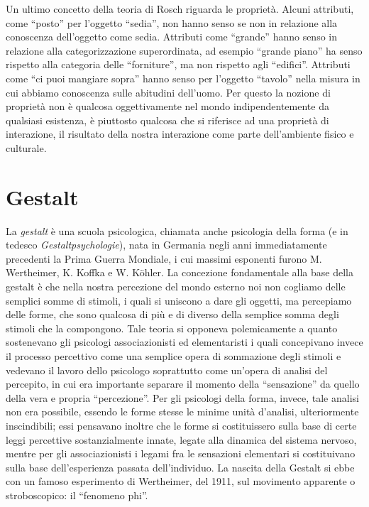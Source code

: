 Un ultimo concetto della teoria di Rosch riguarda le proprietà. Alcuni attributi, come ``posto'' per l’oggetto ``sedia'', non hanno senso se non in relazione alla conoscenza dell’oggetto come sedia. Attributi come ``grande'' hanno senso in relazione alla categorizzazione superordinata, ad esempio ``grande piano'' ha senso rispetto alla categoria delle ``forniture'', ma non rispetto agli ``edifici''. Attributi come ``ci puoi mangiare sopra'' hanno senso per l’oggetto ``tavolo'' nella misura in cui abbiamo conoscenza sulle abitudini dell’uomo. Per questo la nozione di proprietà non è qualcosa oggettivamente nel mondo indipendentemente da qualsiasi esistenza, è piuttosto qualcosa che si riferisce ad una proprietà di interazione, il risultato della nostra interazione come parte dell’ambiente fisico e culturale.

\section{Gestalt}
La \emph{gestalt} è una scuola psicologica, chiamata anche psicologia della forma (e in tedesco \emph{Gestaltpsychologie}), nata in Germania negli anni immediatamente precedenti la Prima Guerra Mondiale, i cui massimi esponenti furono M. Wertheimer, K. Koffka e W. Köhler. La concezione fondamentale alla base della gestalt è che nella nostra percezione del mondo esterno noi non cogliamo delle semplici somme di stimoli, i quali si uniscono a dare gli oggetti, ma percepiamo delle forme, che sono qualcosa di più e di diverso della semplice somma degli stimoli che la compongono. Tale teoria si opponeva polemicamente a quanto sostenevano gli psicologi associazionisti ed elementaristi i quali concepivano invece il processo percettivo come una semplice opera di sommazione degli stimoli e vedevano il lavoro dello psicologo soprattutto come un'opera di analisi del percepito, in cui era importante separare il momento della “sensazione” da quello della vera e propria “percezione”. Per gli psicologi della forma, invece, tale analisi non era possibile, essendo le forme stesse le minime unità d'analisi, ulteriormente inscindibili; essi pensavano inoltre che le forme si costituissero sulla base di certe leggi percettive sostanzialmente innate, legate alla dinamica del sistema nervoso, mentre per gli associazionisti i legami fra le sensazioni elementari si costituivano sulla base dell'esperienza passata dell'individuo. La nascita della Gestalt si ebbe con un famoso esperimento di Wertheimer, del 1911, sul movimento apparente o stroboscopico: il ``fenomeno phi''.

